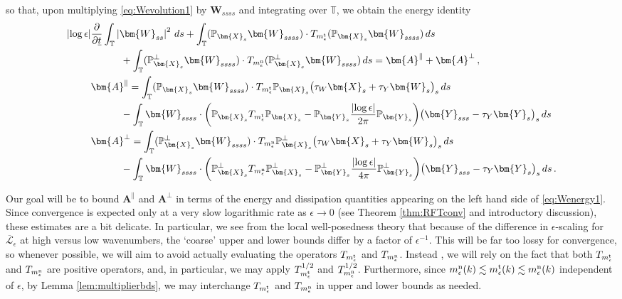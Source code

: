 \documentclass[11pt,reqno]{amsart}
\newcommand{\T}{\mathbb{T}}
\renewcommand{\P}{\mathbb{P}}
\newcommand{\X}{\bm{X}}
\newcommand{\Y}{\bm{Y}}
\newcommand{\p}{\partial}
\newcommand{\abs}[1]{\left\lvert #1 \right\rvert}
\newcommand{\mc}[1]{\mathcal{#1}}
\numberwithin{equation}{section}
\theoremstyle{definition}
\begin{document}
so that, upon multiplying \eqref{eq:Wevolution1} by $\bm{W}_{ssss}$ and integrating over $\T$, we obtain the energy identity 
\begin{equation}\label{eq:Wenergy1}
\begin{aligned}
  \abs{\log\epsilon}&\frac{\p}{\p \underline{t}}\int_\T\abs{\bm{W}_{ss}}^2\,ds +\int_\T (\P_{\X_s}\bm{W}_{ssss})\cdot T_{m_\epsilon^{\rm t}}(\P_{\X_s}\bm{W}_{ssss})\,ds \\
  &\qquad\quad + \int_\T (\P_{\X_s}^\perp\bm{W}_{ssss})\cdot T_{m_\epsilon^{\rm n}}(\P_{\X_s}^\perp\bm{W}_{ssss})\,ds = \bm{A}^\parallel +\bm{A}^\perp \,, \\
  & \bm{A}^\parallel = \int_\T(\P_{\X_s}\bm{W}_{ssss})\cdot T_{m_\epsilon^{\rm t}}\P_{\X_s}\big(\tau_W\X_s+\tau_Y\bm{W}_s \big)_s \,ds \\
  &\qquad\quad - \int_\T \bm{W}_{ssss}\cdot\bigg(\P_{\X_s}T_{m_\epsilon^{\rm t}}\P_{\X_s}-\P_{\Y_s}\frac{\abs{\log\epsilon}}{2\pi}\P_{\Y_s}\bigg)\big(\Y_{sss}-\tau_Y\Y_s \big)_s\,ds\\
  & \bm{A}^\perp = \int_\T (\P_{\X_s}^\perp\bm{W}_{ssss})\cdot T_{m_\epsilon^{\rm n}}\P_{\X_s}^\perp\big(\tau_W\X_s+\tau_Y\bm{W}_s \big)_s\,ds \\
  &\qquad\quad - \int_\T\bm{W}_{ssss}\cdot\bigg(\P_{\X_s}^\perp T_{m_\epsilon^{\rm n}}\P_{\X_s}^\perp-\P_{\Y_s}^\perp\frac{\abs{\log\epsilon}}{4\pi}\P_{\Y_s}^\perp\bigg)\big(\Y_{sss}-\tau_Y\Y_s \big)_s\,ds\,.
\end{aligned}
\end{equation}



Our goal will be to bound $\bm{A}^\parallel$ and $\bm{A}^\perp$ in terms of the energy and dissipation quantities appearing on the left hand side of \eqref{eq:Wenergy1}. Since convergence is expected only at a very slow logarithmic rate as $\epsilon\to 0$ (see Theorem \ref{thm:RFTconv} and introductory discussion), these estimates are a bit delicate. In particular, we see from the local well-posedness theory that because of the difference in $\epsilon$-scaling for $\overline{\mc{L}}_\epsilon$ at high versus low wavenumbers, the `coarse' upper and lower bounds differ by a factor of $\epsilon^{-1}$. This will be far too lossy for convergence, so whenever possible, we will aim to avoid actually evaluating the operators $T_{m_\epsilon^{\rm t}}$ and $T_{m_\epsilon^{\rm n}}$. Instead , we will rely on the fact that both $T_{m_\epsilon^{\rm t}}$ and $T_{m_\epsilon^{\rm n}}$ are positive operators, and, in particular, we may apply $T_{m_\epsilon^{\rm t}}^{1/2}$ and $T_{m_\epsilon^{\rm n}}^{1/2}$. Furthermore, since $m_\epsilon^{\rm n}(k)\lesssim m_\epsilon^{\rm t}(k)\lesssim m_\epsilon^{\rm n}(k)$ independent of $\epsilon$, by Lemma \ref{lem:multiplierbds}, we may interchange $T_{m_\epsilon^{\rm t}}$ and $T_{m_\epsilon^{\rm n}}$ in upper and lower bounds as needed. 
\end{document}

